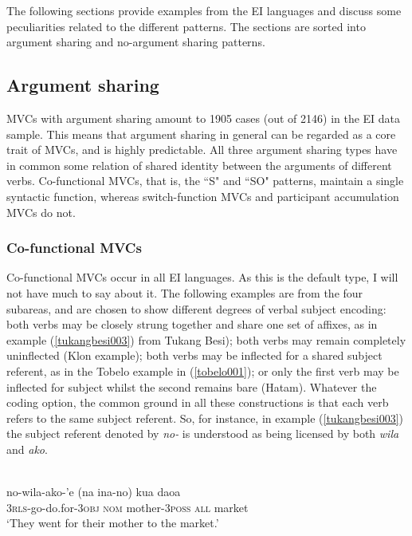 The following sections provide examples from the EI languages and discuss some peculiarities related to the different patterns. The sections are sorted into argument sharing and no-argument sharing patterns.

\subsection{Argument sharing}

MVCs with argument sharing amount to 1905 cases (out of 2146) in the EI data sample. This means that argument sharing in general can be regarded as a core trait of MVCs, and is highly predictable. All three argument sharing types have in common some relation of shared identity between the arguments of different verbs. Co-functional MVCs, that is, the ``S" and ``SO" patterns, maintain a single syntactic function, whereas switch-function MVCs and participant accumulation MVCs do not.

\subsubsection{Co-functional MVCs}

Co-functional MVCs occur in all EI languages. As this is the default type, I will not have much to say about it. The following examples are from the four subareas, and are chosen to show different degrees of verbal subject encoding: both verbs may be closely strung together and share one set of affixes, as in example (\ref{tukangbesi003}) from Tukang Besi); both verbs may remain completely uninflected (Klon example); both verbs may be inflected for a shared subject referent, as in the Tobelo example in (\ref{tobelo001}); or only the first verb may be inflected for subject whilst the second remains bare (Hatam). Whatever the coding option, the common ground in all these constructions is that each verb refers to the same subject referent. So, for instance, in example (\ref{tukangbesi003}) the subject referent denoted by \textit{no-} is understood as being licensed by both \textit{wila} and \textit{ako}.

\ea \label{tukangbesi003}
\\
\gll no-wila-ako-'e (na ina-no) kua daoa \\
3\textsc{rls}-go-do.for-3\textsc{obj} \textsc{nom} mother-3\textsc{poss} \textsc{all} market \\
\glft `They went for their mother to the market.'\\ 
\z

